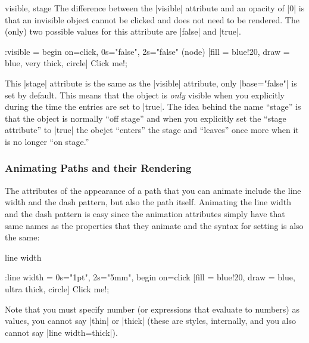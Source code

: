 \begin{tikzanimateattribute}{visible, stage}
  The difference between the |visible| attribute and an opacity of |0| is
  that an invisible object cannot be clicked and does not need to be
  rendered. The (only) two possible values for this attribute are
  |false| and |true|.

\begin{codeexample}[animation list={1,2,3,4}]
\tikz :visible = {begin on=click, 0s="false", 2s="false"}
  \node (node) [fill = blue!20, draw = blue, very thick, circle] {Click me!}; 
\end{codeexample}

  This |stage| attribute is the same as the |visible| attribute, only
  |base="false"| is set by default. This means that the object is
  \emph{only} visible when you explicitly during the time the entries
  are set to |true|. The idea behind the name ``stage'' is that the
  object is normally ``off stage'' and when you explicitly set the
  ``stage attribute'' to |true| the obejct ``enters'' the stage and
  ``leaves'' once more when it is no longer ``on stage.''
  
\begin{codeexample}[animation list={-1,0,1,2,3},animation bb={(1.3,-0.7) rectangle (2.7,0.7)}]
\end{codeexample}
\end{tikzanimateattribute}




\subsubsection{Animating Paths and their Rendering}
\label{section-animation-paths}

The attributes of the appearance of a path that you can animate
include the line width and the dash pattern, but also the path
itself. Animating the line width and the dash pattern is easy since
the animation attributes simply have that same names as the properties
that they animate and the syntax for setting is also the same:

\begin{tikzanimateattribute}{line width}
\begin{codeexample}[animation list={0.5,1,1.5,2}]
\tikz \node :line width = { 0s="1pt", 2s="5mm", begin on=click}
  [fill = blue!20, draw = blue, ultra thick, circle] {Click me!}; 
\end{codeexample}
  Note that you must specify number (or expressions that evaluate to
  numbers) as values, you cannot say |thin| or |thick| (these are
  styles, internally, and you also cannot say |line width=thick|).
\end{tikzanimateattribute}

